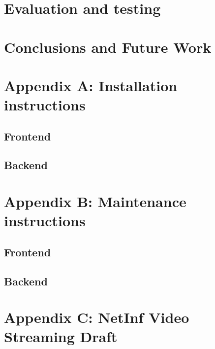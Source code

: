 \documentclass[11pt]{report}
\begin{document}








\chapter{Evaluation and testing}



\chapter{Conclusions and Future Work}



\chapter{Appendix A: Installation instructions}
\section {Frontend}

\section {Backend}

\chapter {Appendix B: Maintenance instructions}

\section{Frontend}

\section{Backend}

\chapter {Appendix C: NetInf Video Streaming Draft}

\end{document}
